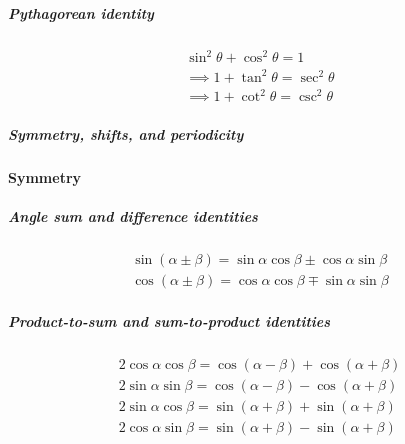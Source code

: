 \documentclass{article}
\begin{document}
\subparagraph{Pythagorean identity}
\begin{align*}
  \sin^2 \theta +   \cos^2 \theta = 1\\
  \implies 1 + \tan^2 \theta = \sec^2 \theta\\
  \implies 1 + \cot^2 \theta = \csc^2 \theta
\end{align*}

\subparagraph{Symmetry, shifts, and periodicity}
\textbf{Symmetry}

\subparagraph{Angle sum and difference identities}

\begin{align*}
  \sin(\alpha \pm \beta) = \sin\alpha \cos\beta \pm \cos\alpha \sin\beta\\
  \cos(\alpha \pm \beta) = \cos\alpha \cos\beta \mp \sin\alpha \sin\beta
\end{align*}


\subparagraph{Product-to-sum and sum-to-product identities}
\begin{align*}
   2 \cos \alpha \cos \beta = \cos(\alpha - \beta) + \cos(\alpha + \beta)\\
   2 \sin \alpha \sin \beta = \cos(\alpha - \beta) - \cos(\alpha + \beta)\\
   2 \sin \alpha \cos \beta = \sin(\alpha + \beta) + \sin(\alpha + \beta)\\
   2 \cos \alpha \sin \beta = \sin(\alpha + \beta) - \sin(\alpha + \beta)
\end{align*}




\end{document}
